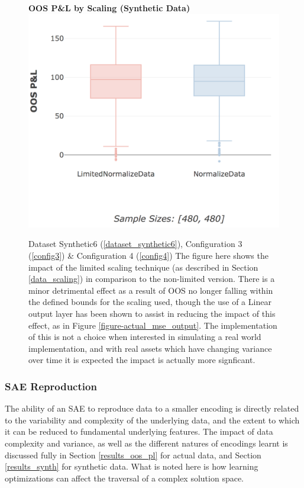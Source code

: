 \documentclass[a4paper,11pt,oneside]{article}
\theoremstyle{plain}
\theoremstyle{definition}
\begin{document}
	\begin{figure}[H]
		\centering
		\textbf{OOS P\&L by Scaling (Synthetic Data)} 
		\includegraphics[scale=0.34]{images/results/complexity/oos_scaling.png}
		\caption[OOS P\&L by Scaling (Synthetic Data)]{Dataset Synthetic6  (\ref{dataset_synthetic6}), Configuration 3 (\ref{config3}) \& Configuration 4 (\ref{config4})
				\newline The figure here shows the impact of the limited scaling technique (as described in Section \ref{data_scaling}) in comparison to the non-limited version. There is a minor detrimental effect as a result of OOS no longer falling within the defined bounds for the scaling used, though the use of a Linear output layer has been shown to assist in reducing the impact of this effect, as in Figure \ref{figure-actual_mse_output}. The implementation of this is not a choice when interested in simulating a real world implementation, and with real assets which have changing variance over time it is expected the impact is actually more signficant. }
		\label{figure-synth_pl_scaling}
	\end{figure}


	
	\subsubsection{SAE Reproduction}

	The ability of an SAE to reproduce data to a smaller encoding is directly related to the variability and complexity of the underlying data, and the extent to which it can be reduced to fundamental underlying features. The impact of data complexity and variance, as well as the different natures of encodings learnt is discussed fully in Section \ref{results_oos_pl} for actual data, and Section \ref{results_synth} for synthetic data. What is noted here is how learning optimizations can affect the traversal of a complex solution space. \newline
	
\end{document}
